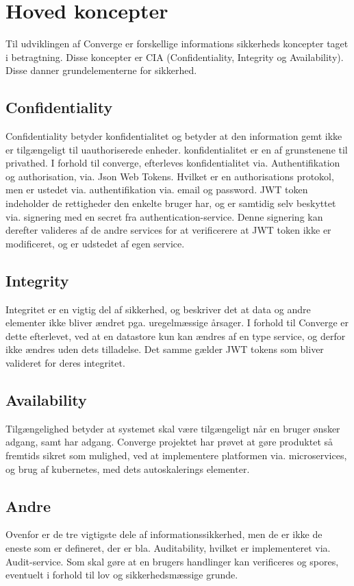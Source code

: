 \chapter{Hoved koncepter}

Til udviklingen af Converge er forskellige informations sikkerheds koncepter taget i betragtning. Disse koncepter er CIA (Confidentiality, Integrity og Availability). Disse danner grundelementerne for sikkerhed.

\section{Confidentiality}

Confidentiality betyder konfidentialitet og betyder at den information gemt ikke er tilgængeligt til uauthoriserede enheder. konfidentialitet er en af grunstenene til privathed. I forhold til converge, efterleves konfidentialitet via. Authentifikation og authorisation, via. Json Web Tokens. Hvilket er en authorisations protokol, men er ustedet via. authentifikation via. email og password. JWT token indeholder de rettigheder den enkelte bruger har, og er samtidig selv beskyttet via. signering med en secret fra authentication-service. Denne signering kan derefter valideres af de andre services for at verificerere at JWT token ikke er modificeret, og er udstedet af egen service.

\section{Integrity}

Integritet er en vigtig del af sikkerhed, og beskriver det at data og andre elementer ikke bliver ændret pga. uregelmæssige årsager. I forhold til Converge er dette efterlevet, ved at en datastore kun kan ændres af en type service, og derfor ikke ændres uden dets tilladelse. Det samme gælder JWT tokens som bliver valideret for deres integritet.

\section{Availability}

Tilgængelighed betyder at systemet skal være tilgængeligt når en bruger ønsker adgang, samt har adgang. Converge projektet har prøvet at gøre produktet så fremtids sikret som mulighed, ved at implementere platformen via. microservices, og brug af kubernetes, med dets autoskalerings elementer.

\section{Andre}

Ovenfor er de tre vigtigste dele af informationssikkerhed, men de er ikke de eneste som er defineret, der er bla. Auditability,  hvilket er implementeret via. Audit-service. Som skal gøre at en brugers handlinger kan verificeres og spores, eventuelt i forhold til lov og sikkerhedsmæssige grunde.

